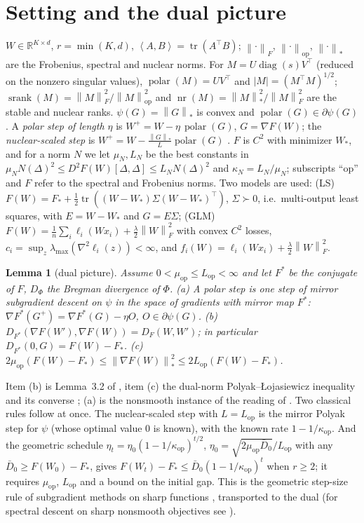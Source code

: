 \documentclass[11pt]{article}
\newtheorem{lemma}[theorem]{Lemma}
\theoremstyle{remark}
\newcommand{\R}{\mathbb{R}}
\newcommand{\nop}[1]{\left\|#1\right\|_{\mathrm{op}}}
\newcommand{\nnuc}[1]{\left\|#1\right\|_{*}}
\newcommand{\nF}[1]{\left\|#1\right\|_{F}}
\newcommand{\inner}[2]{\left\langle #1, #2 \right\rangle}
\newcommand{\abs}[1]{\left|#1\right|}
\newcommand{\tr}{\operatorname{tr}}
\newcommand{\diag}{\operatorname{diag}}
\newcommand{\polar}{\operatorname{polar}}
\newcommand{\srank}{\operatorname{srank}}
\newcommand{\nr}{\operatorname{nr}}
\newcommand{\Lop}{L_{\mathrm{op}}}
\newcommand{\muop}{\mu_{\mathrm{op}}}
\newcommand{\kop}{\kappa_{\mathrm{op}}}
\newcommand{\lmax}{\lambda_{\max}}
\begin{document}
\section{Setting and the dual picture}\label{sec:setting}

$W\in\R^{K\times d}$, $r=\min(K,d)$, $\inner AB=\tr(A^\top B)$; $\nF\cdot$, $\nop\cdot$, $\nnuc\cdot$ are the Frobenius,
spectral and nuclear norms. For $M=U\diag(s)V^\top$ (reduced on the nonzero singular values), $\polar(M)=UV^\top$ and
$\abs M=(M^\top M)^{1/2}$; $\srank(M)=\nF M^2/\nop M^2$ and $\nr(M)=\nnuc M^2/\nF M^2$ are the stable and nuclear ranks.
$\psi(G)=\nnuc G$ is convex and $\polar(G)\in\partial\psi(G)$. A \emph{polar step of length $\eta$} is
$W^+=W-\eta\,\polar(G)$, $G=\nabla F(W)$; the \emph{nuclear-scaled step} is $W^+=W-\frac{\nnuc G}{L}\polar(G)$
\cite{carlson2015stochastic,lau2025polargrad}. $F$ is $C^2$ with minimizer $W_\ast$, and for a norm $N$ we let
$\mu_N,L_N$ be the best constants in
$\mu_NN(\Delta)^2\le D^2F(W)[\Delta,\Delta]\le L_NN(\Delta)^2$ and $\kappa_N=L_N/\mu_N$; subscripts ``op'' and $F$ refer
to the spectral and Frobenius norms. Two models are used: (LS) $F(W)=F_\ast+\frac12\tr((W-W_\ast)\Sigma(W-W_\ast)^\top)$,
$\Sigma\succ0$, i.e.\ multi-output least squares, with $E=W-W_\ast$ and $G=E\Sigma$; (GLM)
$F(W)=\frac1n\sum_i\ell_i(Wx_i)+\frac\lambda2\nF W^2$ with convex $C^2$ losses,
$c_i=\sup_z\lmax(\nabla^2\ell_i(z))<\infty$, and $f_i(W)=\ell_i(Wx_i)+\frac\lambda2\nF W^2$.

\begin{lemma}[dual picture]\label{lem:dual}
Assume $0<\muop\le\Lop<\infty$ and let $F^\ast$ be the conjugate of $F$, $D_\Phi$ the Bregman divergence of $\Phi$.
(a) A polar step is one step of mirror subgradient descent on $\psi$ in the space of gradients with mirror map
$F^\ast$: $\nabla F^\ast(G^+)=\nabla F^\ast(G)-\eta O$, $O\in\partial\psi(G)$.
(b) $D_{F^\ast}(\nabla F(W'),\nabla F(W))=D_F(W,W')$; in particular $D_{F^\ast}(0,G)=F(W)-F_\ast$.
(c) $2\muop(F(W)-F_\ast)\le\nnuc{\nabla F(W)}^2\le2\Lop(F(W)-F_\ast)$.
\end{lemma}
Item (b) is Lemma~3.2 of \cite{maddison2021dual}, item (c) the dual-norm Polyak--\L{}ojasiewicz inequality and its
converse \cite{balles2020geometry,leplat2025norm}; (a) is the nonsmooth instance of the reading of
\cite{maddison2021dual}. Two classical rules follow at once. The nuclear-scaled step with $L=\Lop$ is the mirror
Polyak step \cite{dorazio2023stochastic} for $\psi$ (whose optimal value $0$ is known), with the known rate
$1-1/\kop$. And the geometric schedule $\eta_t=\eta_0(1-1/\kop)^{t/2}$, $\eta_0=\sqrt{2\muop\bar D_0}/\Lop$ with any
$\bar D_0\ge F(W_0)-F_\ast$, gives $F(W_t)-F_\ast\le\bar D_0(1-1/\kop)^t$ when $r\ge2$; it requires $\muop$, $\Lop$ and
a bound on the initial gap. This is the geometric step-size rule of subgradient methods on sharp functions
\cite{goffin1977convergence}, transported to the dual (for spectral descent on sharp nonsmooth objectives see
\cite{yang2026convergence}).
\end{document}
